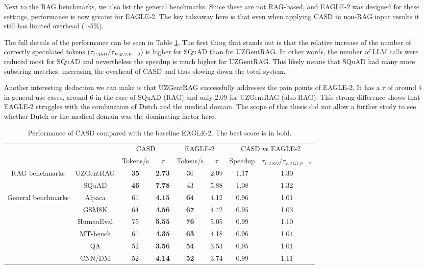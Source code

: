 Next to the RAG benchmarks, we also list the general benchmarks. Since these are not RAG-based, and EAGLE-2 was designed for these settings, performance is now greater for EAGLE-2. The key takeaway here is that even when applying CASD to non-RAG input results it still has limited overhead (1-5\%).

The full details of the performance can be seen in Table \ref{tab:performance_benchmarks}. The first thing that stands out is that the relative increase of the number of correctly speculated tokens ($\tau_{CASD} / \tau_{EAGLE-2}$) is higher for SQuAD than for UZGentRAG. In other words, the number of LLM calls were reduced most for SQuAD and nevertheless the speedup is much higher for UZGentRAG. This likely means that SQuAD had many more substring matches, increasing the overhead of CASD and thus slowing down the total system.

Another interesting deduction we can make is that UZGentRAG successfully addresses the pain points of EAGLE-2. It has a $\tau$ of around 4 in general use cases, around 6 in the case of SQuAD (RAG) and only 2.09 for UZGentRAG (also RAG). This strong difference shows that EAGLE-2 struggles with the combination of Dutch and the medical domain. The scope of this thesis did not allow a further study to see whether Dutch or the medical domain was the dominating factor here.

\begin{table}[h]
    \centering
    \begin{tabular}{cccc|cc|cc}
        & & \multicolumn{2}{c}{CASD} & \multicolumn{2}{c}{EAGLE-2} & \multicolumn{2}{c}{CASD vs EAGLE-2} \\
        \cline{3-8}
        & & Tokens/s & $\tau$ & Tokens/s & $\tau$ & Speedup & $\tau_{CASD} / \tau_{EAGLE-2}$ \\
        \hline
        \multirow{2}{*}{RAG benchmarks} & UZGentRAG & \textbf{35} & \textbf{2.73} & 30 & 2.09 & 1.17 & 1.30 \\
        & SQuAD             & \textbf{46} & \textbf{7.78} & 43 & 5.88 & 1.08 & 1.32 \\
        \hline
        \multirow{6}{*}{General benchmarks} & Alpaca & 61 & \textbf{4.15} & \textbf{64} & 4.12 & 0.96 & 1.01 \\
        & GSM8K             & 64 & \textbf{4.56} & \textbf{67} & 4.42 & 0.95 & 1.03 \\
        & HumanEval         & 75 & \textbf{5.55} & \textbf{76} & 5.05 & 0.99 & 1.10 \\
        & MT-bench          & 61 & \textbf{4.35} & \textbf{63} & 4.18 & 0.96 & 1.04 \\
        & QA                & 52 & \textbf{3.56} & \textbf{54} & 3.53 & 0.95 & 1.01 \\
        & CNN/DM            & 52 & \textbf{4.14} & \textbf{52} & 3.74 & 0.99 & 1.11 \\
        \hline
    \end{tabular}
    \caption{Performance of CASD compared with the baseline EAGLE-2. The best score is in bold.}
    \label{tab:performance_benchmarks}
\end{table}

